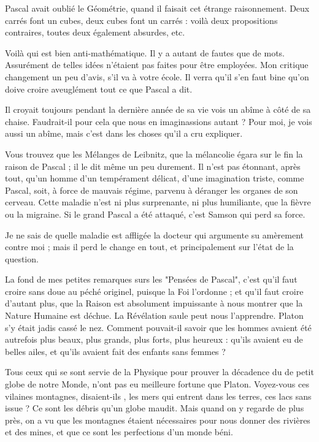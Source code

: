 \documentclass[french,twoside]{book} %
\begin{document}
Pascal avait oublié le Géométrie, quand il faisait cet étrange raisonnement. Deux carrés font un cubes, deux cubes font un carrés : voilà deux propositions contraires, toutes deux également absurdes, etc.\par
Voilà qui est bien anti-mathématique. Il y a autant de fautes que de mots. Assurément de telles idées n’étaient pas faites pour être employées. Mon critique changement un peu d’avis, s’il va à votre école. Il verra qu’il s’en faut bine qu’on doive croire aveuglément tout ce que Pascal a dit.\par
Il croyait toujours pendant la dernière année de sa vie vois un abîme à côté de sa chaise. Faudrait-il pour cela que nous en imaginassions autant ? Pour moi, je vois aussi un abîme, mais c’est dans les choses qu’il a cru expliquer.\par
Vous trouvez que les Mélanges de Leibnitz, que la mélancolie égara sur le fin la raison de Pascal ; il le dit même un peu durement. Il n’est pas étonnant, après tout, qu’un homme d’un tempérament délicat, d’une imagination triste, comme Pascal, soit, à force de mauvais régime, parvenu à déranger les organes de son cerveau. Cette maladie n’est ni plus surprenante, ni plus humiliante, que la fièvre ou la migraine. Si le grand Pascal a été attaqué, c’est Samson qui perd sa force.\par
Je ne sais de quelle maladie est affligée la docteur qui argumente su amèrement contre moi ; mais il perd le change en tout, et principalement sur l’état de la question. \par
La fond de mes petites remarques surs les "Pensées de Pascal", c’est qu’il faut croire sans doue au péché originel, puisque la Foi l’ordonne ; et qu’il faut croire d’autant plus, que la Raison est absolument impuissante à nous montrer que la Nature Humaine est déchue. La Révélation saule peut nous l’apprendre. Platon s’y était jadis cassé le nez. Comment pouvait-il savoir que les hommes avaient été autrefois plus beaux, plus grands, plus forts, plus heureux : qu’ils avaient eu de belles ailes, et qu’ils avaient fait des enfants sans femmes ?\par
Tous ceux qui se sont servie de la Physique pour prouver la décadence du de petit globe de notre Monde, n’ont pas eu meilleure fortune que Platon. Voyez-vous ces vilaines montagnes, disaient-ils , les mers qui entrent dans les terres, ces lacs sans issue ? Ce sont les débris qu’un globe maudit. Mais quand on y regarde de plus près, on a vu que les montagnes étaient nécessaires pour nous donner des rivières et des mines, et que ce sont les perfections d’un monde béni.\par
\end{document}
